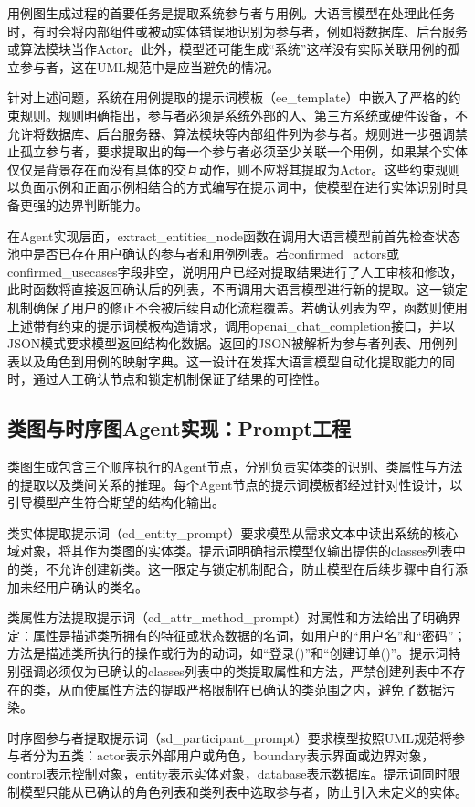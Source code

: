 用例图生成过程的首要任务是提取系统参与者与用例。大语言模型在处理此任务时，有时会将内部组件或被动实体错误地识别为参与者，例如将数据库、后台服务或算法模块当作Actor。此外，模型还可能生成“系统”这样没有实际关联用例的孤立参与者，这在UML规范中是应当避免的情况。

针对上述问题，系统在用例提取的提示词模板（ee\_template）中嵌入了严格的约束规则。规则明确指出，参与者必须是系统外部的人、第三方系统或硬件设备，不允许将数据库、后台服务器、算法模块等内部组件列为参与者。规则进一步强调禁止孤立参与者，要求提取出的每一个参与者必须至少关联一个用例，如果某个实体仅仅是背景存在而没有具体的交互动作，则不应将其提取为Actor。这些约束规则以负面示例和正面示例相结合的方式编写在提示词中，使模型在进行实体识别时具备更强的边界判断能力。

在Agent实现层面，extract\_entities\_node函数在调用大语言模型前首先检查状态池中是否已存在用户确认的参与者和用例列表。若confirmed\_actors或confirmed\_usecases字段非空，说明用户已经对提取结果进行了人工审核和修改，此时函数将直接返回确认后的列表，不再调用大语言模型进行新的提取。这一锁定机制确保了用户的修正不会被后续自动化流程覆盖。若确认列表为空，函数则使用上述带有约束的提示词模板构造请求，调用openai\_chat\_completion接口，并以JSON模式要求模型返回结构化数据。返回的JSON被解析为参与者列表、用例列表以及角色到用例的映射字典。这一设计在发挥大语言模型自动化提取能力的同时，通过人工确认节点和锁定机制保证了结果的可控性。

\subsection{类图与时序图Agent实现：Prompt工程}

类图生成包含三个顺序执行的Agent节点，分别负责实体类的识别、类属性与方法的提取以及类间关系的推理。每个Agent节点的提示词模板都经过针对性设计，以引导模型产生符合期望的结构化输出。

类实体提取提示词（cd\_entity\_prompt）要求模型从需求文本中读出系统的核心域对象，将其作为类图的实体类。提示词明确指示模型仅输出提供的classes列表中的类，不允许创建新类。这一限定与锁定机制配合，防止模型在后续步骤中自行添加未经用户确认的类名。

类属性方法提取提示词（cd\_attr\_method\_prompt）对属性和方法给出了明确界定：属性是描述类所拥有的特征或状态数据的名词，如用户的“用户名”和“密码”；方法是描述类所执行的操作或行为的动词，如“登录()”和“创建订单()”。提示词特别强调必须仅为已确认的classes列表中的类提取属性和方法，严禁创建列表中不存在的类，从而使属性方法的提取严格限制在已确认的类范围之内，避免了数据污染。

时序图参与者提取提示词（sd\_participant\_prompt）要求模型按照UML规范将参与者分为五类：actor表示外部用户或角色，boundary表示界面或边界对象，control表示控制对象，entity表示实体对象，database表示数据库。提示词同时限制模型只能从已确认的角色列表和类列表中选取参与者，防止引入未定义的实体。

